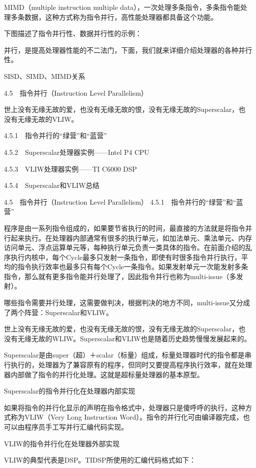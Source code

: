 \documentclass[12pt,UTF8]{ctexbook}
\begin{document}
MIMD（multiple instruction multiple data），一次处理多条指令，多条指令能处理多条数据，这种方式称为指令并行，高性能处理器都具备这个功能。

下图描述了指令并行性、数据并行性的示例：

并行，是提高处理器性能的不二法门，下面，我们就来详细介绍处理器的各种并行性。

SISD、SIMD、MIMD关系


4.5　指令并行（Instruction Level Parallelism）

世上没有无缘无故的爱，也没有无缘无故的恨，没有无缘无故的Superscalar，也没有无缘无故的VLIW。

4.5.1　指令并行的“绿营”和“蓝营”

4.5.2　Superscalar处理器实例——Intel P4 CPU

4.5.3　VLIW处理器实例——TI C6000 DSP

4.5.4　Superscalar和VLIW总结


4.5　指令并行（Instruction Level Parallelism）
4.5.1　指令并行的“绿营”和“蓝营”

程序是由一系列指令组成的，如果要节省执行的时间，最直接的方法就是将指令并行起来执行。在处理器内部通常有很多的执行单元，如加法单元、乘法单元、内存访问单元、浮点运算单元等，每种执行单元负责一类具体的指令。在前面介绍的乱序执行内核中，每个Cycle最多只发射一条指令，即使有时很多指令并行执行，平均的指令执行效率也最多只有每个Cycle一条指令。如果发射单元一次能发射多条指令，那么就有更多指令能并行处理了，因此指令并行也称为multi-issue（多发射）。

哪些指令需要并行处理，这需要做判决，根据判决的地方不同，multi-issue又分成了两个阵营：Superscalar和VLIW。

世上没有无缘无故的爱，也没有无缘无故的恨，没有无缘无故的Superscalar，也没有无缘无故的WLIW。Superscalar和VLIW也是随着历史趋势慢慢发展起来的。

Superscalar是由super（超）＋scalar（标量）组成，标量处理器时代的指令都是串行执行的，处理器为了兼容原有的程序，但同时又要提高程序执行效率，就在处理器内部做了指令的并行化处理。这就是超标量处理器的基本原型。

Superscalar的指令并行化在处理器内部实现

如果将指令的并行化显示的声明在指令格式中，处理器只是傻呼呼的执行，这种方式称为VLIW（Very Long Instruction Word）。指令的并行化可由编译器完成，也可以由程序员手工写并行汇编代码实现。

VLIW的指令并行化在处理器外部实现

VLIW的典型代表是DSP。TIDSP所使用的汇编代码格式如下：
\end{document}
